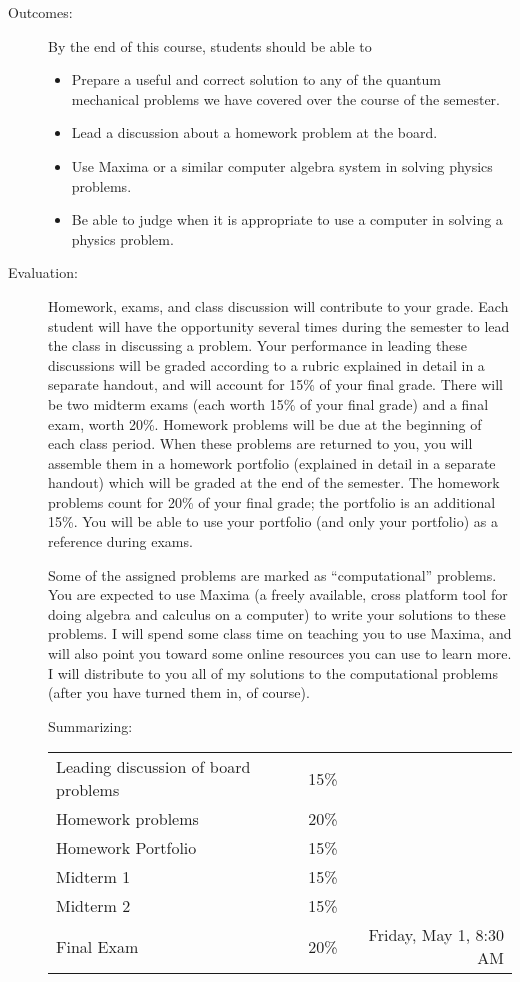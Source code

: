 \documentclass{article}
\begin{document}
\begin{description}
\item[Outcomes:] By the end of this course, students should be able to
  \begin{itemize}
  \item Prepare a useful and correct solution to any of the quantum
    mechanical problems we have covered over the course of the
    semester.
  \item Lead a discussion about a homework problem at the board.
  \item Use Maxima or a similar computer algebra system in solving
    physics problems.
  \item Be able to judge when it is appropriate to use a computer in
    solving a physics problem.
\end{itemize}
\item[Evaluation:] Homework, exams, and class discussion will
  contribute to your grade.  Each student will have the opportunity
  several times during the semester to lead the class in discussing a
  problem.  Your performance in leading these discussions will be
  graded according to a rubric explained in detail in a separate
  handout, and will account for 15\% of your final grade. There will
  be two midterm exams (each worth 15\% of your final grade) and a
  final exam, worth 20\%.  Homework problems will be due at the
  beginning of each class period.  When these problems are returned to
  you, you will assemble them in a homework portfolio (explained in
  detail in a separate handout) which will be graded at the end of the
  semester.  The homework problems count for 20\% of your final grade;
  the portfolio is an additional 15\%.  You will be able to use your
  portfolio (and only your portfolio) as a reference during exams.

  Some of the assigned problems are marked as ``computational''
  problems.  You are expected to use Maxima (a freely available, cross
  platform tool for doing algebra and calculus on a computer) to write
  your solutions to these problems.  I will spend some class time on
  teaching you to use Maxima, and will also point you toward some
  online resources you can use to learn more. I will distribute to you
  all of my solutions to the computational problems (after you have
  turned them in, of course).

  Summarizing:
  \begin{tabular}{lcr}
    Leading discussion of board problems & 15\% &\\
    Homework problems & 20\% &\\
    Homework Portfolio & 15\% &\\
    Midterm 1& 15\% & \\
    Midterm 2& 15\% & \\
    Final Exam & 20\% & Friday, May 1, 8:30 AM\\
  \end{tabular}


\end{description}
\end{document}
